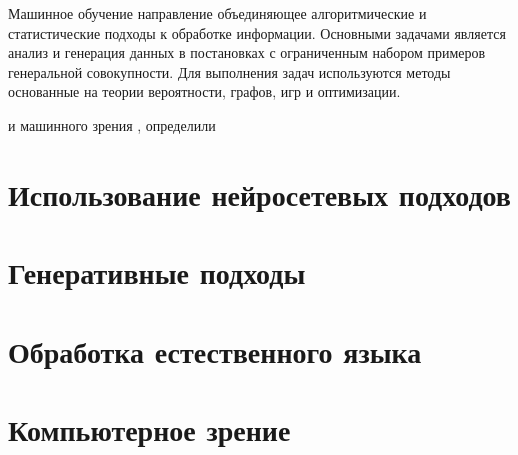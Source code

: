 Машинное обучение направление объединяющее алгоритмические и статистические подходы к обработке информации.
Основными задачами является анализ и генерация данных в постановках с ограниченным набором примеров генеральной совокупности.
Для выполнения задач используются методы основанные на теории вероятности, графов, игр и оптимизации. 


и машинного зрения \cite{rombach2022highresolution},\cite{song2020generative} определили

\section{Использование нейросетевых подходов}



\section{Генеративные подходы}



\section{Обработка естественного языка}



\section{Компьютерное зрение}



